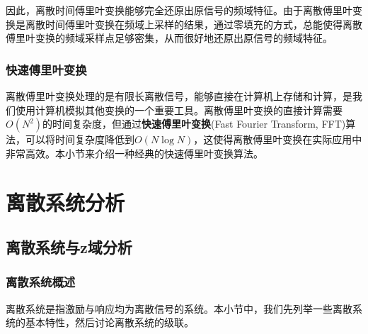 \documentclass{ctexbook}
\begin{document}
因此，离散时间傅里叶变换能够完全还原出原信号的频域特征。由于离散傅里叶变换是离散时间傅里叶变换在频域上采样的结果，通过零填充的方式，总能使得离散傅里叶变换的频域采样点足够密集，从而很好地还原出原信号的频域特征。

\subsection{快速傅里叶变换}\label{sub:FFT}

离散傅里叶变换处理的是有限长离散信号，能够直接在计算机上存储和计算，是我们使用计算机模拟其他变换的一个重要工具。离散傅里叶变换的直接计算需要$O(N^2)$的时间复杂度，但通过\textbf{快速傅里叶变换}(Fast Fourier Transform, FFT)算法，可以将时间复杂度降低到$O(N\log N)$，这使得离散傅里叶变换在实际应用中非常高效。本小节来介绍一种经典的快速傅里叶变换算法。

\chapter{离散系统分析}

\section{离散系统与z域分析}\label{sec:Discrete_System_z_Analysis}


\subsection{离散系统概述}\label{sub:discrete_system_overview}

离散系统是指激励与响应均为离散信号的系统。本小节中，我们先列举一些离散系统的基本特性，然后讨论离散系统的级联。
\end{document}
